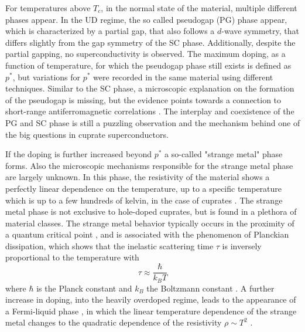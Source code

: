 For temperatures above $T_c$, in the normal state of the material, multiple different phases appear.
In the UD regime, the so called pseudogap (PG) phase appear, which is characterized by a partial gap, that also follows a $d$-wave symmetry, that differs slightly from the gap symmetry of the SC phase.
Additionally, despite the partial gapping, no superconductivity is observed.
The maximum doping, as a function of temperature, for which the pseudogap phase still exists is defined as $p^*$, but variations for $p^*$ were recorded in the same material using different techniques.
Similar to the SC phase, a microscopic explanation on the formation of the pseudogap is missing, but the evidence points towards a connection to short-range antiferromagnetic correlations \cite{zhang_effective_1988, rice_theory_1973}.
The interplay and coexistence of the PG and SC phase is still a puzzling observation and the mechanism behind one of the big questions in cuprate superconductors.

If the doping is further increased beyond $p^*$ a so-called "strange metal" phase forms.
Also the microscopic mechanisms responsible for the strange metal phase are largely unknown.
In this phase, the resistivity of the material shows a perfectly linear dependence on the temperature, up to a specific temperature which is up to a few hundreds of kelvin, in the case of cuprates \cite{martin_normal-state_1990,daou_linear_2009,cooper_anomalous_2009}.
The strange metal phase is not exclusive to hole-doped cuprates, but is found in a plethora of material classes.
The strange metal behavior typically occurs in the proximity of a quantum critical point \cite{cooper_anomalous_2009,varma_singular_2002,marel_quantum_2003}, and is associated with the phenomenon of Planckian dissipation, which shows that the inelastic scattering time $\tau$ is inversely proportional to the temperature with
\begin{equation}
	\tau \approx \frac{\hbar}{k_BT}
\end{equation}
where $\hbar$ is the Planck constant and $k_B$ the Boltzmann constant \cite{ataei_electrons_2022,bruin_similarity_2013}.
A further increase in doping, into the heavily overdoped regime, leads to the appearance of a Fermi-liquid phase \cite{barisic_evidence_2019}, in which the linear temperature dependence of the strange metal changes to the quadratic dependence of the resistivity $\rho\sim T^2$ \cite{nakamae_electronic_2003,hussey_coherent_2003,plate_fermi_2005}.

